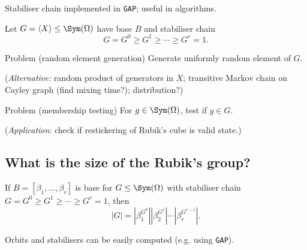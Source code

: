 \begin{slide}
    Stabiliser chain implemented in \texttt{GAP}; useful in algorithms. \pause

    Let $G = \langle X \rangle \leq \Sym(\Omega)$ have base $B$ and stabiliser chain
    $$G = G^0 \geq G^1 \geq \dotsb \geq G^r = 1.$$ \pause

    \begin{alertblock}{Problem (random element generation)}
        \vspace{0pt}
        Generate uniformly random element of $G$.

        (\textit{Alternative:} \pause random product of generators in $X$; transitive Markov chain on Cayley graph (find mixing time?); distribution?)
    \end{alertblock} \pause

    \begin{alertblock}{Problem (membership testing)}
        \vspace{0pt}
        For $g \in \Sym(\Omega)$, test if $g \in G$.

        (\textit{Application}: \pause check if restickering of Rubik's cube is valid state.)
    \end{alertblock}
\end{slide}

\subsection{What is the size of the Rubik's group?}

\begin{slide}
    \begin{theorem}
        \vspace{0pt}
        If $B = [\beta_1,\dotsc,\beta_r]$ is base for $G \leq \Sym(\Omega)$ with stabiliser chain $G = G^0 \geq G^1 \geq \dotsb \geq G^r = 1$, then
        $$|G| = |\beta_1^{G^0}||\beta_2^{G^1}| \dotsb |\beta_r^{G^{r-1}}|.$$
    \end{theorem}

    Orbits and stabilisers can be easily computed (e.g. using \texttt{GAP}).


\end{slide}